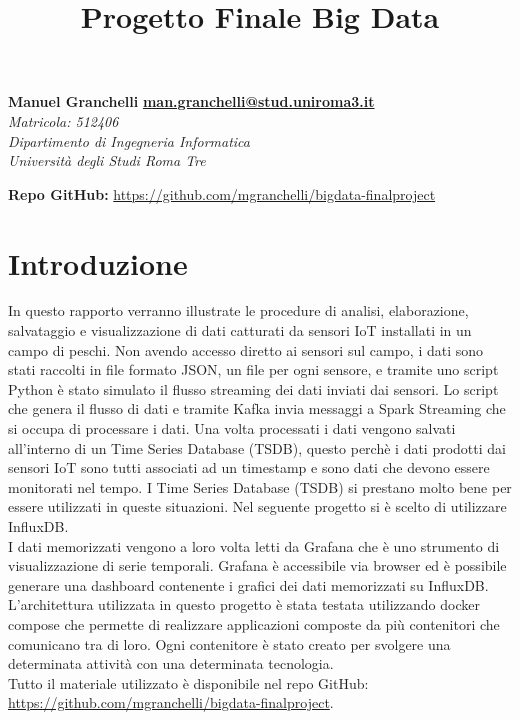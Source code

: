 \documentclass{article}
\title{\textbf{Progetto Finale Big Data}}
\date{}
\begin{document}
\maketitle

\begin{flushleft}
\textbf{Manuel Granchelli} 
\hfill {\href{mailto:man.granchelli@stud.uniroma3.it}{\textbf{man.granchelli@stud.uniroma3.it}}} \\
\textit{Matricola: 512406}\\
\textit{Dipartimento di Ingegneria Informatica}\\
\textit{Università degli Studi Roma Tre}\\
\par\bigskip
\textbf{Repo GitHub:} \href{https://github.com/mgranchelli/bigdata-finalproject}{https://github.com/mgranchelli/bigdata-finalproject}
\end{flushleft}

\section*{Introduzione}
In questo rapporto verranno illustrate le procedure di analisi, elaborazione, salvataggio e visualizzazione di dati catturati da sensori IoT installati in un campo di peschi. Non avendo accesso diretto ai sensori sul campo, i dati sono stati raccolti in file formato JSON, un file per ogni sensore, e tramite uno script Python è stato simulato il flusso streaming dei dati inviati dai sensori.
Lo script che genera il flusso di dati e tramite Kafka invia messaggi a Spark Streaming che si occupa di processare i dati. Una volta processati i dati vengono salvati all'interno di un Time Series Database (TSDB), questo perchè i dati prodotti dai sensori IoT sono tutti associati ad un timestamp e sono dati che devono essere monitorati nel tempo. I Time Series Database (TSDB) si prestano molto bene per essere utilizzati in queste situazioni. Nel seguente progetto si è scelto di utilizzare InfluxDB. \\
I dati memorizzati vengono a loro volta letti da Grafana che è uno strumento di visualizzazione di serie temporali. Grafana è accessibile via browser ed è possibile generare una dashboard contenente i grafici dei dati memorizzati su InfluxDB. \\
L'architettura utilizzata in questo progetto è stata testata utilizzando docker compose che permette di realizzare applicazioni composte da più contenitori che comunicano tra di loro. Ogni contenitore è stato creato per svolgere una determinata attività con una determinata tecnologia. \\
Tutto il materiale utilizzato è disponibile nel repo GitHub:\\ \href{https://github.com/mgranchelli/bigdata-finalproject}{https://github.com/mgranchelli/bigdata-finalproject}.
\end{document}

